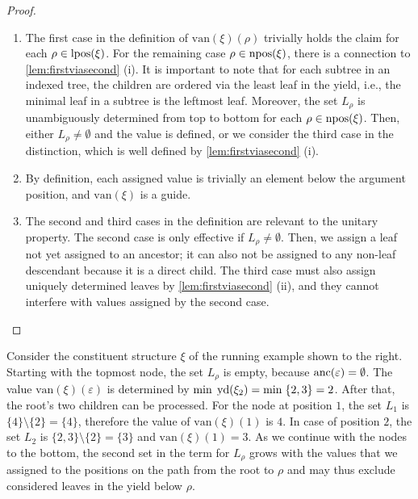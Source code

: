 \documentclass[../../document.tex]{subfiles}
\begin{document}
    \begin{proof}
        \begin{enumerate}
            \item
                The first case in the definition of \(\mathrm{van}(\xi)(\rho)\) trivially holds the claim for each \(\rho \in \operatorname{lpos}(\xi)\).
                For the remaining case \(\rho \in \operatorname{npos}(\xi)\), there is a connection to \cref{lem:firstviasecond} (i).
                It is important to note that for each subtree in an indexed tree, the children are ordered via the least leaf in the yield, i.e., the minimal leaf in a subtree is the leftmost leaf.
                Moreover, the set \(L_\rho\) is unambiguously determined from top to bottom for each \(\rho \in \operatorname{npos}(\xi)\).
                Then, either \(L_\rho \neq \emptyset\) and the value is defined, or we consider the third case in the distinction, which is well defined by \cref{lem:firstviasecond} (i).
            \item
                By definition, each assigned value is trivially an element below the argument position, and \(\mathrm{van}(\xi)\) is a guide.
            \item
                The second and third cases in the definition are relevant to the unitary property.
                The second case is only effective if \(L_\rho \neq \emptyset\).
                Then, we assign a leaf not yet assigned to an ancestor; it can also not be assigned to any non-leaf descendant because it is a direct child.
                The third case must also assign uniquely determined leaves by \cref{lem:firstviasecond} (ii), and they cannot interfere with values assigned by the second case.
        \end{enumerate}
    \end{proof}

    \begin{wrapfigure}[6]{r}{.3\linewidth}
        \centering
        
    \end{wrapfigure}
    Consider the constituent structure \(\xi\) of the running example shown to the right.
    Starting with the topmost node, the set \(L_\rho\) is empty, because \(\operatorname{anc}(\varepsilon) = \emptyset\).
    The value \(\mathrm{van}(\xi)(\varepsilon)\) is determined by \(\min\;\operatorname{yd}(\xi_{2}) = \min\;\{2,3\} = 2\).
    After that, the root's two children can be processed.
    For the node at position \(1\), the set \(L_{1}\) is \(\{4\} \setminus \{2\} = \{4\}\), therefore the value of \(\mathrm{van}(\xi)(1)\) is \(4\).
    In case of position \(2\), the set \(L_{2}\) is \(\{2,3\} \setminus \{2\} = \{3\}\) and \(\mathrm{van}(\xi)(1)=3\).
    As we continue with the nodes to the bottom, the second set in the term for \(L_\rho\) grows with the values that we assigned to the positions on the path from the root to \(\rho\) and may thus exclude considered leaves in the yield below \(\rho\).
    \exampleqed
\end{document}
